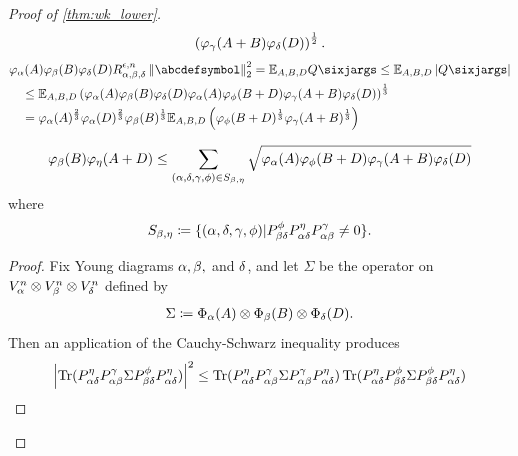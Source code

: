 \documentclass[notitlepage, 10pt]{article}
\begin{document}
\begin{proof}[Proof of \cref{thm:wk_lower}]
\begin{align}
        \left(\varphi_{\gamma}(A+B)\varphi_{\delta}(D)\right)^{\frac{1}{2}}.
    \end{align}
    \begin{align}
        &\varphi_{\ya}(A)\varphi_{\yb}(B)\varphi_{\yd}(D) R^{\ye,n}_{\ya,\yb,\yd}\norm{\abcdefsymbol}_2^2 = \mathbb E_{A,B,D}Q\sixjargs \leq \mathbb E_{A,B,D}\abs{Q\sixjargs}\\
        &\quad\leq \mathbb E_{A,B,D} \left(\varphi_{\ya}(A)\varphi_{\yb}(B)\varphi_{\yd}(D)\varphi_{\ya}(A)\varphi_{\yf}(B+D)\varphi_{\yc}(A+B)\varphi_{\yd}(D)\right)^{\frac{1}{3}} \\
        &\quad= \varphi_{\ya}(A)^{\frac{2}{3}}\varphi_{\ya}(D)^{\frac{2}{3}}\varphi_{\yb}(B)^{\frac{1}{3}} \mathbb E_{A,B,D} \left(\varphi_{\yf}(B+D)^{\frac{1}{3}}\varphi_{\yc}(A+B)^{\frac{1}{3}}\right)
    \end{align}
    \begin{thm}
        \begin{equation}
            \varphi_{\beta}(B)\varphi_{\eta}(A+D) \leq \sum_{(\alpha,\delta,\gamma,\phi) \in S_{\beta,\eta}} \sqrt{\varphi_{\alpha}(A)\varphi_{\phi}(B+D)\varphi_{\gamma}(A+B)\varphi_{\delta}(D)}
        \end{equation}
        where 
        \begin{equation}
            S_{\beta,\eta} \coloneqq \{(\alpha,\delta,\gamma,\phi) | P^{\phi}_{\beta\delta} P^{\eta}_{\alpha\delta} P^{\gamma}_{\alpha\beta} \neq 0 \}. \\
        \end{equation}
    \end{thm}
    \begin{proof}
        Fix Young diagrams $\alpha,\beta,$ and $\delta$, and let $\Sigma$ be the operator on $V_{\alpha}^{n} \otimes V_{\beta}^{n} \otimes V_{\delta}^{n}$ defined by
        \begin{align}
            \Sigma \coloneqq \Phi_{\alpha}(A) \otimes \Phi_{\beta}(B) \otimes \Phi_{\delta}(D).
        \end{align}
        Then an application of the Cauchy-Schwarz inequality produces
        \begin{align}
            \abs{\Tr(P^{\eta}_{\ya\yd} P^{\yc}_{\ya\yb} \Sigma P^{\yf}_{\yb\yd} P^{\eta}_{\ya\yd})}^2
            &\leq \Tr(P^{\eta}_{\ya\yd} P^{\yc}_{\ya\yb} \Sigma P^{\yc}_{\ya\yb} P^{\eta}_{\ya\yd})\Tr(P^{\eta}_{\ya\yd} P^{\yf}_{\yb\yd} \Sigma P^{\yf}_{\yb\yd} P^{\eta}_{\ya\yd}) \\

\end{align}
\end{proof}
\end{proof}
\end{document}
